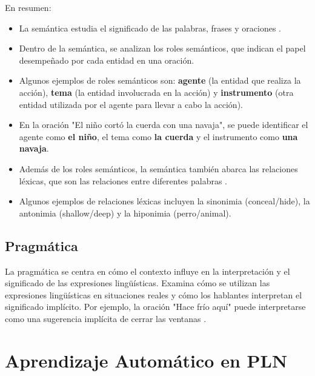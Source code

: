 En resumen:
\begin{itemize}
\item La semántica estudia el significado de las palabras, frases y oraciones \cite{JohnsonMLSS}.
\item Dentro de la semántica, se analizan los roles semánticos, que indican el papel desempeñado por cada entidad en una oración.
\item Algunos ejemplos de roles semánticos son: \textcolor[rgb]{0.00,0.00,1.00}{\textbf{agente}} (la entidad que realiza la acción), \textcolor[rgb]{1.00,0.00,0.00}{\textbf{tema}} (la entidad involucrada en la acción) y \textcolor[rgb]{0.00,1.00,0.00}{\textbf{instrumento}} (otra entidad utilizada por el agente para llevar a cabo la acción).
\item En la oración "El niño cortó la cuerda con una navaja", se puede identificar el agente como \textcolor[rgb]{0.00,0.00,1.00}{\textbf{el niño}}, el tema como \textcolor[rgb]{1.00,0.00,0.00}{\textbf{la cuerda}} y el instrumento como \textcolor[rgb]{0.00,1.00,0.00}{\textbf{una navaja}}.
\item Además de los roles semánticos, la semántica también abarca las relaciones léxicas, que son las relaciones entre diferentes palabras \cite{yule2016study}.
\item Algunos ejemplos de relaciones léxicas incluyen la sinonimia (conceal/hide), la antonimia (shallow/deep) y la hiponimia (perro/animal).
\end{itemize}


\subsection{Pragmática}

La pragmática se centra en cómo el contexto influye en la interpretación y el significado de las expresiones lingüísticas. Examina cómo se utilizan las expresiones lingüísticas en situaciones reales y cómo los hablantes interpretan el significado implícito. Por ejemplo, la oración "Hace frío aquí" puede interpretarse como una sugerencia implícita de cerrar las ventanas \cite{fromkin2018introduction}.


\section{Aprendizaje Automático en PLN}

